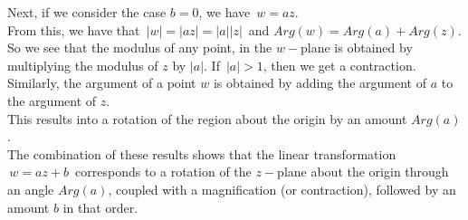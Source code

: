\documentclass[11pt,a4paper]{article}
\theoremstyle{definition}
\begin{document}
Next, if we consider the case $b = 0$, we have $\, w = az$.\\
From this, we have that $\,\left|w\right| = \left|az\right| = \left|a\right| \left|z\right|\,$ and $Arg (w) = Arg (a) + Arg (z)$.\\
So we see that the modulus of any point, in the $w-$plane is obtained by multiplying the modulus of $z$ by $\left|a\right|$. If $\,\left|a\right|> 1$, then we get a contraction.\\

Similarly, the argument of a point $w$ is obtained by adding the argument of $a$ to the argument of $z$.\\
This results into a rotation of the region about the origin by an amount $Arg(a)$.\\

The combination of these results shows that the linear transformation $\, w = az + b\,$ corresponds to a rotation of the $z-$plane about the origin through an angle $Arg(a)$, coupled with a magnification (or contraction), followed by an amount $b$ in that order.\\\\









\pagebreak
\end{document}
